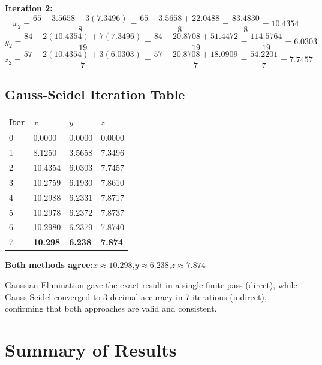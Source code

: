 \documentclass[12pt]{article}
\newcommand{\hcell}[1]{\textbf{\color{white}#1}}
\begin{document}
\noindent\textbf{Iteration 2:}
\[
  x_2 = \frac{65 - 3.5658 + 3(7.3496)}{8} = \frac{65 - 3.5658 + 22.0488}{8} = \frac{83.4830}{8} = 10.4354
\]
\[
  y_2 = \frac{84 - 2(10.4354) + 7(7.3496)}{19} = \frac{84 - 20.8708 + 51.4472}{19} = \frac{114.5764}{19} = 6.0303
\]
\[
  z_2 = \frac{57 - 2(10.4354) + 3(6.0303)}{7} = \frac{57 - 20.8708 + 18.0909}{7} = \frac{54.2201}{7} = 7.7457
\]

\vspace{6pt}

\subsection*{Gauss-Seidel Iteration Table}

\begin{center}
\begin{tabular}{C{1cm} C{2.5cm} C{2.5cm} C{2.5cm}}
\toprule
{}
\hcell{Iter} & \hcell{$x$} & \hcell{$y$} & \hcell{$z$} \\
\midrule
{}
0 & 0.0000 & 0.0000 & 0.0000 \\
1 & 8.1250 & 3.5658 & 7.3496 \\
2 & 10.4354 & 6.0303 & 7.7457 \\
3 & 10.2759 & 6.1930 & 7.8610 \\
4 & 10.2988 & 6.2331 & 7.8717 \\
5 & 10.2978 & 6.2372 & 7.8737 \\
6 & 10.2980 & 6.2379 & 7.8740 \\
7 & \textbf{10.298} & \textbf{6.238} & \textbf{7.874} \\
\bottomrule
\end{tabular}
\end{center}

\begin{answerbox}
\textbf{Both methods agree:}\quad $x \approx \mathbf{10.298}$,\quad $y \approx \mathbf{6.238}$,\quad $z \approx \mathbf{7.874}$

\medskip
Gaussian Elimination gave the exact result in a single finite pass (direct), while Gauss-Seidel converged to 3-decimal accuracy in 7 iterations (indirect), confirming that both approaches are valid and consistent.
\end{answerbox}

\newpage

\section*{Summary of Results}
\end{document}
